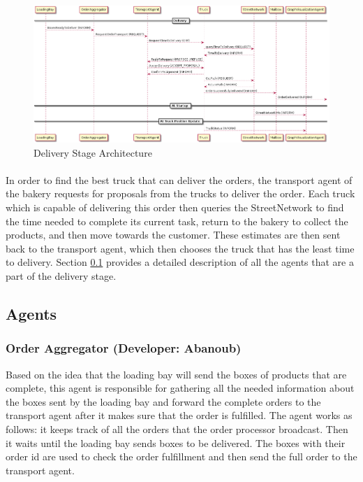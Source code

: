 \documentclass[11pt, a4paper]{article}
\begin{document}
\begin{figure}[h!]
	\centering
	\includegraphics[width=\textwidth]{../Architecture/Architecture_Delivery.png}
	\caption{Delivery Stage Architecture}
	\label{DeliveryArchitecture}
\end{figure}

\paragraph{}
In order to find the best truck that can deliver the orders, the transport agent of the bakery requests for proposals from the trucks to deliver the order. Each truck which is capable of delivering this order then queries the StreetNetwork to find the time needed to complete its current task, return to the bakery to collect the products, and then move towards the customer. These estimates are then sent back to the transport agent, which then chooses the truck that has the least time to delivery.  Section \ref{DeliveryAgents} provides a detailed description of all the agents that are a part of the delivery stage.

\subsection{Agents}\label{DeliveryAgents}
\subsubsection{Order Aggregator (Developer: Abanoub)}
Based on the idea that the loading bay will send the boxes of products that are complete, this agent is responsible for gathering all the needed information about the boxes sent by the loading bay and forward the complete orders to the transport agent after it makes sure that the order is fulfilled. The agent works as follows: it keeps track of all the orders that the order processor broadcast. Then it waits until the loading bay sends boxes to be delivered. The boxes with their order id are used to check the order fulfillment and then send the full order to the transport agent.
\end{document}
